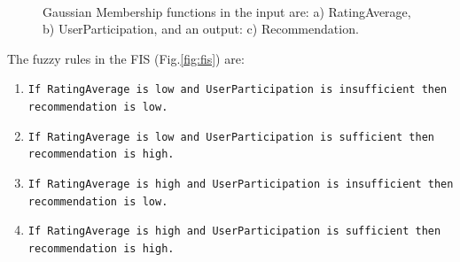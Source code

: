 \begin{figure}[ht!]
   \centering
   \hspace{0.1\linewidth}
   \\[20pt]
   \caption{Gaussian Membership functions in the input are: a) RatingAverage, 
   b) UserParticipation, and an output: c) Recommendation.}
   \label{fig:mffis} 
\end{figure}

The fuzzy rules in the FIS (Fig.\ref{fig:fis}) are:
\begin{enumerate} 
\item \texttt{If RatingAverage is low and UserParticipation is  insufficient then recommendation is low.}
\item \texttt{If RatingAverage is low and UserParticipation is  sufficient   then recommendation is high.} 
\item \texttt{If RatingAverage is high and UserParticipation is insufficient then recommendation is low.}
\item \texttt{If RatingAverage is high and UserParticipation is sufficient   then recommendation is high.}
\end{enumerate} 

